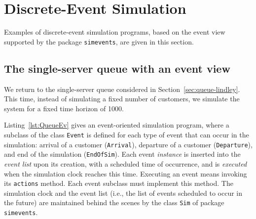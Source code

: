\section {Discrete-Event Simulation}
\label {sec:event}

Examples of discrete-event simulation programs, based on the event view
supported by the package \texttt{simevents}, are given in this section.

\subsection {The single-server queue with an event view}
\label {sec:queue-event}

We return to the single-server queue considered in
Section~\ref{sec:queue-lindley}.
This time, instead of simulating a fixed number of customers,
we simulate the system for a fixed time horizon of 1000.




Listing~\ref{lst:QueueEv} gives an event-oriented simulation program,
where a subclass of the class \texttt{Event} is defined for each type
of event that can occur in the simulation:
arrival of a customer (\texttt{Arrival}),
departure of a customer (\texttt{Departure}),
and end of the simulation (\texttt{EndOfSim}).
Each event {\em instance\/} is inserted into the {\em event list\/}
upon its creation, with a scheduled time of occurrence, and is
{\em executed\/} when the simulation clock reaches this time.
Executing an event means invoking its \texttt{actions} method.
Each event subclass must implement this method.
The simulation clock and the event list (i.e., the list of events
scheduled to occur in the future) are maintained behind the
scenes by the class \texttt{Sim} of package \texttt{simevents}.

